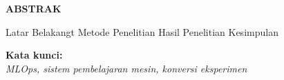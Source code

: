 \clearpage
{}
\begin{center}
  \textbf{\large \MakeUppercase{Abstrak}}\\[3em]
\end{center}

Latar Belakangt
Metode Penelitian
Hasil Penelitian
Kesimpulan


\noindent \textbf{Kata kunci:}\\
\emph{MLOps, sistem pembelajaran mesin, konversi eksperimen}

